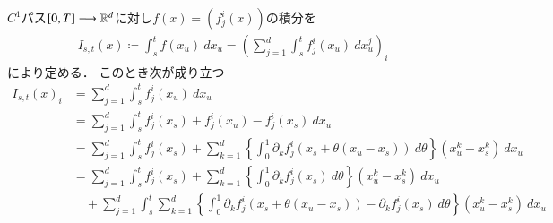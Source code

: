 $C^1$パス$[0,T] \longrightarrow \mathbb{R}^d$に対し$f(x) = (f_j^i(x))$の積分を
\begin{align}
	I_{s,t} (x)
	\coloneqq \int_s^t f(x_u)\ dx_u
	= \left( \sum_{j=1}^d \int_s^t f_j^i(x_u)\ dx^j_u \right)_i
\end{align}
により定める．
このとき次が成り立つ
\begin{align}
	I_{s,t}(x)_i
	&= \sum_{j=1}^d \int_s^t f_j^i(x_u)\ dx_u \\
	&= \sum_{j=1}^d \int_s^t f_j^i(x_s) + f_j^i(x_u) - f_j^i(x_s)\ dx_u \\
	&= \sum_{j=1}^d \int_s^t f_j^i(x_s) 
		+ \sum_{k=1}^d  \left\{ \int_0^1 \partial_k f_j^i(x_s + \theta(x_u - x_s))\ d\theta \right\} (x^k_u - x^k_s)\ dx_u \\
	&= \sum_{j=1}^d \int_s^t f_j^i(x_s) + \sum_{k=1}^d  \left\{ \int_0^1 \partial_k f_j^i(x_s)\ d\theta \right\} (x^k_u - x^k_s)\ dx_u \\
		&\quad + \sum_{j=1}^d \int_s^t \sum_{k=1}^d  \left\{ \int_0^1 \partial_k f_j^i(x_s + \theta(x_u - x_s)) - \partial_k f_j^i(x_s)\ d\theta \right\} (x^k_u - x^k_s)\ dx_u \\
\end{align}

